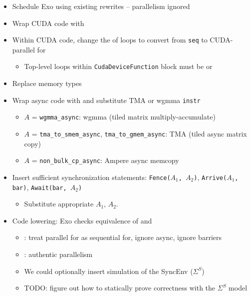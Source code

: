 \newpage
{}

\begin{itemize}
  \item Schedule Exo using existing rewrites -- parallelism ignored
  \item Wrap CUDA code with 
  \item Within CUDA code, change the  of loops to convert from \texttt{seq} to CUDA-parallel for
  \begin{itemize}
    \item Top-level loops within \texttt{CudaDeviceFunction} block must be  or 
  \end{itemize}
  \item Replace memory types
  \item Wrap async code with  and substitute TMA or wgmma \texttt{instr}
  \begin{itemize}
    \item $A$ = \texttt{wgmma\_async}: wgmma (tiled matrix multiply-accumulate)
    \item $A$ = \texttt{tma\_to\_smem\_async}, \texttt{tma\_to\_gmem\_async}: TMA (tiled async matrix copy)
    \item $A$ = \texttt{non\_bulk\_cp\_async}: Ampere async memcopy
  \end{itemize}
  \item Insert sufficient synchronization statements: \texttt{Fence($A_1$, $A_2$)}, \texttt{Arrive($A_1$, bar)}, \texttt{Await(bar, $A_2$)}
  \begin{itemize}
    \item Substitute appropriate  $A_1$, $A_2$.
  \end{itemize}
  \item Code lowering: Exo checks equivalence of  and 
  \begin{itemize}
    \item {}: treat parallel for as sequential for, ignore async, ignore barriers
    \item {}: authentic parallelism
    \item We could optionally insert simulation of the SyncEnv ($\Sigma^S$)
    \item TODO: figure out how to statically prove correctness with the $\Sigma^S$ model
  \end{itemize}
\end{itemize}

